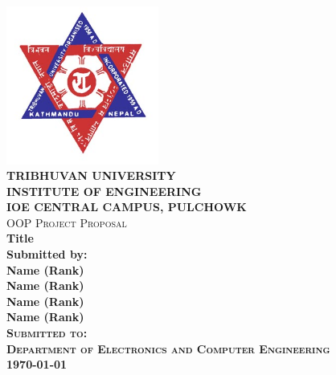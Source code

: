 

\begin{titlepage}
	
	\newcommand{\HRule}{\rule{\linewidth}{0.3mm}}
	\center
	\vfill
	\includegraphics[width=50mm]{images/tu.jpg}\\
	\textsc{\LARGE \bfseries TRIBHUVAN UNIVERSITY}\\[0.5cm] %
	\textsc{\large \bfseries INSTITUTE OF ENGINEERING}\\
	\textsc{\large \bfseries IOE CENTRAL CAMPUS, PULCHOWK}\\[0.5cm]
	\vfill
	\textsc{OOP Project Proposal} \\[0.2cm]
	\vfill
	\Large \textbf{Title}\\[0.5cm]
	\bfseries
	Submitted by:\\
	Name (Rank)\\
	Name (Rank)\\
	Name (Rank)\\
	Name (Rank)\\[0.5cm]
	
	\textsc{Submitted to:}\\
	\textsc{Department of Electronics and Computer Engineering}
	\\[0.4cm]
	
	{\large \today}
	\vfill
\end{titlepage}
